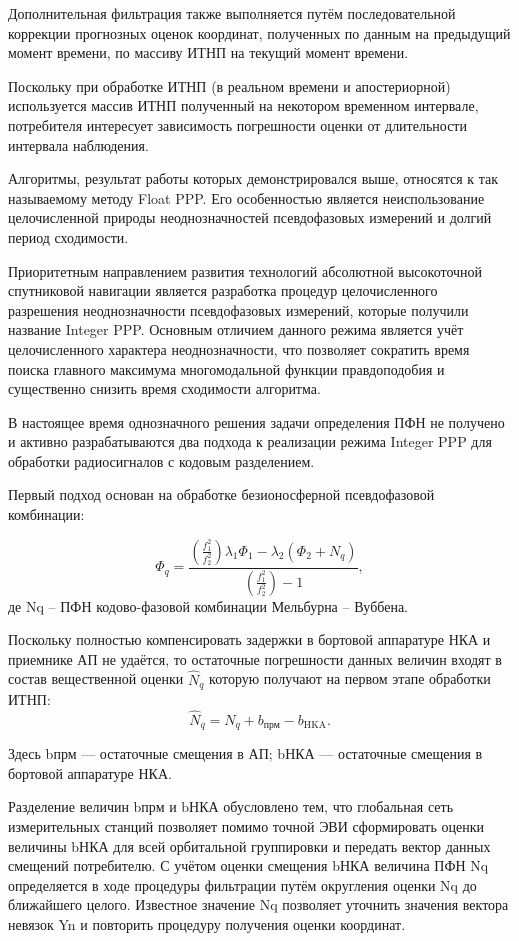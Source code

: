 \documentclass[14pt,a4paper,oneside]{extarticle}
\begin{document}
Дополнительная фильтрация также выполняется путём последовательной коррекции прогнозных оценок координат, полученных по данным на предыдущий момент времени, по массиву ИТНП на текущий момент времени.

Поскольку при обработке ИТНП (в реальном времени и апостериорной) используется массив ИТНП полученный на некотором временном интервале, потребителя интересует зависимость погрешности оценки от длительности интервала наблюдения.

Алгоритмы, результат работы которых демонстрировался выше, относятся к так называемому методу Float PPP. Его особенностью является неиспользование целочисленной природы неоднозначностей псевдофазовых измерений и долгий период сходимости.

Приоритетным направлением развития технологий абсолютной высокоточной спутниковой навигации является разработка процедур целочисленного разрешения неоднозначности псевдофазовых измерений, которые получили название Integer PPP. Основным отличием данного режима является учёт целочисленного характера неоднозначности, что позволяет сократить время поиска главного максимума многомодальной функции правдоподобия и существенно снизить время сходимости алгоритма.

В настоящее время однозначного решения задачи определения ПФН не получено и активно разрабатываются два подхода к реализации режима Integer PPP для обработки радиосигналов с кодовым разделением.

Первый подход основан на обработке безионосферной псевдофазовой комбинации:

\[\Phi_{q}=\frac{\left(\frac{f_{1}^{2}}{f_{2}^{2}}\right)\lambda_{1}\Phi_{1}-\lambda_{2}\left(\Phi_{2}+N_{q}\right)}{\left(\frac{f_{1}^{2}}{f_{2}^{2}}\right)-1},\]
де Nq – ПФН кодово-фазовой комбинации Мельбурна – Вуббена.

Поскольку полностью компенсировать задержки в бортовой аппаратуре НКА и приемнике АП не удаётся, то остаточные погрешности данных величин входят в состав вещественной оценки $\hat{N}_q$ которую получают на первом этапе обработки ИТНП:
\[\hat{N}_{q}=N_{q}+b_{\text{прм}}-b_{\text{HKA}}.\]

Здесь bпрм –– остаточные смещения в АП; bНКА –– остаточные смещения в бортовой аппаратуре НКА.

Разделение величин bпрм и bНКА обусловлено тем, что глобальная сеть измерительных станций позволяет помимо точной ЭВИ сформировать оценки величины bНКА для всей орбитальной группировки и передать вектор данных смещений потребителю. С учётом оценки смещения bНКА величина ПФН Nq определяется в ходе процедуры фильтрации путём округления оценки Nq до ближайшего целого. Известное значение Nq позволяет уточнить значения вектора невязок Yn и повторить процедуру получения оценки координат.
\end{document}
